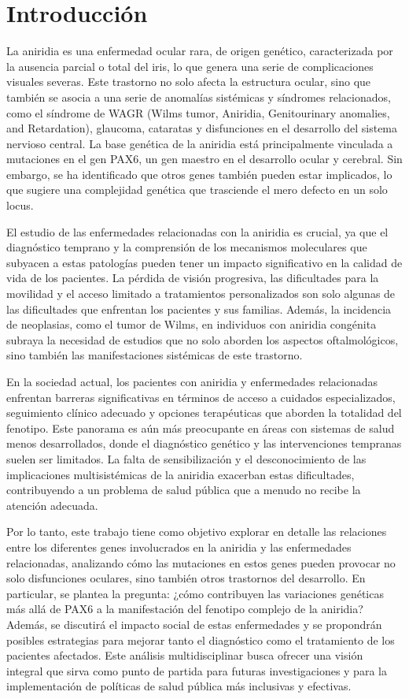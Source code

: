 \section{Introducción}

La aniridia es una enfermedad ocular rara, de origen genético, caracterizada por la ausencia parcial o total del iris, lo que genera una serie de complicaciones visuales severas. Este trastorno no solo afecta la estructura ocular, sino que también se asocia a una serie de anomalías sistémicas y síndromes relacionados, como el síndrome de WAGR (Wilms tumor, Aniridia, Genitourinary anomalies, and Retardation), glaucoma, cataratas y disfunciones en el desarrollo del sistema nervioso central. La base genética de la aniridia está principalmente vinculada a mutaciones en el gen PAX6, un gen maestro en el desarrollo ocular y cerebral. Sin embargo, se ha identificado que otros genes también pueden estar implicados, lo que sugiere una complejidad genética que trasciende el mero defecto en un solo locus.

El estudio de las enfermedades relacionadas con la aniridia es crucial, ya que el diagnóstico temprano y la comprensión de los mecanismos moleculares que subyacen a estas patologías pueden tener un impacto significativo en la calidad de vida de los pacientes. La pérdida de visión progresiva, las dificultades para la movilidad y el acceso limitado a tratamientos personalizados son solo algunas de las dificultades que enfrentan los pacientes y sus familias. Además, la incidencia de neoplasias, como el tumor de Wilms, en individuos con aniridia congénita subraya la necesidad de estudios que no solo aborden los aspectos oftalmológicos, sino también las manifestaciones sistémicas de este trastorno.

En la sociedad actual, los pacientes con aniridia y enfermedades relacionadas enfrentan barreras significativas en términos de acceso a cuidados especializados, seguimiento clínico adecuado y opciones terapéuticas que aborden la totalidad del fenotipo. Este panorama es aún más preocupante en áreas con sistemas de salud menos desarrollados, donde el diagnóstico genético y las intervenciones tempranas suelen ser limitados. La falta de sensibilización y el desconocimiento de las implicaciones multisistémicas de la aniridia exacerban estas dificultades, contribuyendo a un problema de salud pública que a menudo no recibe la atención adecuada.

Por lo tanto, este trabajo tiene como objetivo explorar en detalle las relaciones entre los diferentes genes involucrados en la aniridia y las enfermedades relacionadas, analizando cómo las mutaciones en estos genes pueden provocar no solo disfunciones oculares, sino también otros trastornos del desarrollo. En particular, se plantea la pregunta: ¿cómo contribuyen las variaciones genéticas más allá de PAX6 a la manifestación del fenotipo complejo de la aniridia? Además, se discutirá el impacto social de estas enfermedades y se propondrán posibles estrategias para mejorar tanto el diagnóstico como el tratamiento de los pacientes afectados. Este análisis multidisciplinar busca ofrecer una visión integral que sirva como punto de partida para futuras investigaciones y para la implementación de políticas de salud pública más inclusivas y efectivas.